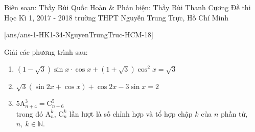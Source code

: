 	\begin{name}
{Biên soạn: Thầy Bùi Quốc Hoàn \& Phản biện: Thầy Bùi Thanh Cương}
		{Đề thi Học Kì 1, 2017 - 2018 trường THPT Nguyễn Trung Trực, Hồ Chí Minh}
	\end{name}
	\setcounter{ex}{0}\setcounter{bt}{0}
	[ans/ans-1-HK1-34-NguyenTrungTruc-HCM-18]
	
\begin{bt}%
Giải các phương trình sau:
		\begin{enumerate}
			\item $\left(1 - \sqrt{3}\right)\sin x\cdot \cos x + \left(1 + \sqrt{3}\right)\cos^2x = \sqrt{3}$
		    \item $\sqrt{3}\left(\sin 2x  + \cos x\right) +  \cos 2x - 3\sin x = 2$
		    \item  $5\mathrm{A}^{3}_{n + 4} = \mathrm{C}^{5}_{n + 6}$\\
		    trong đó $\mathrm{A}^{k}_{n}$, $\mathrm{C}^{k}_{n}$ lần lượt là số chỉnh hợp và tổ hợp chập $k$ của $n$ phần tử, $n,\ k\in\mathbb{N}$.
	    \end{enumerate}
\end{bt}
